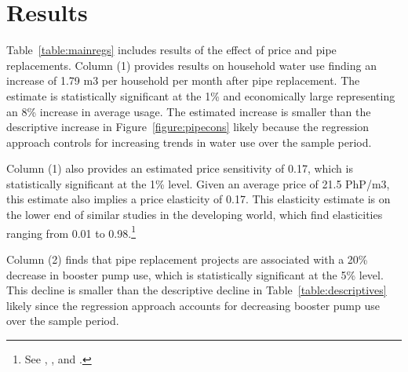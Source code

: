 \documentclass[12pt,table]{article}
\begin{document}


\section{Results}

Table~\ref{table:mainregs} includes results of the effect of price and pipe replacements.  Column (1) provides results on household water use finding an increase of 1.79 m3 per household per month after pipe replacement.  The estimate is statistically significant at the 1\% and economically large representing an 8\% increase in average usage.  The estimated increase is smaller than the descriptive increase in Figure~\ref{figure:pipecons} likely because the regression approach controls for increasing trends in water use over the sample period.  

Column (1) also provides an estimated price sensitivity of 0.17, which is statistically significant at the 1\% level.  Given an average price of 21.5 PhP/m3, this estimate also implies a price elasticity of 0.17.  This elasticity estimate is on the lower end of similar studies in the developing world, which find elasticities ranging from 0.01 to 0.98.\footnote{See \cite{szabo2015value}, \cite{diakite2009proposal}, and \cite{strand2005water}.}  

Column (2) finds that pipe replacement projects are associated with a 20\% decrease in booster pump use, which is statistically significant at the 5\% level.  This decline is smaller than the descriptive decline in Table~\ref{table:descriptives} likely since the regression approach accounts for decreasing booster pump use over the sample period.
\end{document}
